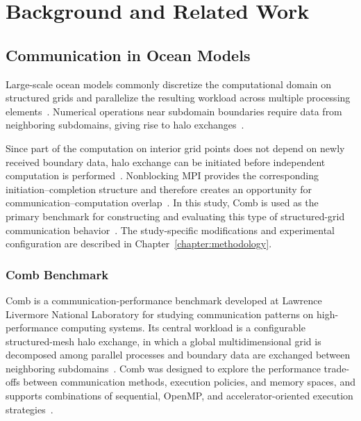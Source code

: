 
\chapter{Background and Related Work}\label{chapter:background}

\section{Communication in Ocean Models}

Large-scale ocean models commonly discretize the computational domain on
structured grids and parallelize the resulting workload across multiple
processing elements~\cite{mittermair2025automatic}.
Numerical operations near subdomain boundaries require data from neighboring
subdomains, giving rise to halo exchanges~\cite{mitgcmCommunication,mittermair2025automatic}.

Since part of the computation on interior grid points does not depend on newly received boundary data, halo exchange can be initiated before independent computation is performed~\cite{mitgcmCommunication,mittermair2025automatic}. Nonblocking MPI provides the corresponding initiation--completion structure and therefore creates an opportunity for communication--computation overlap~\cite[Sec.~4.7]{mpi50}. In this study, Comb is used as the primary benchmark for constructing and evaluating this type of structured-grid communication behavior~\cite{combGithub}. The study-specific modifications and experimental configuration are described in Chapter~\ref{chapter:methodology}.

\subsection{Comb Benchmark}

Comb is a communication-performance benchmark developed at Lawrence
Livermore National Laboratory for studying communication patterns on
high-performance computing systems. Its central workload is a configurable
structured-mesh halo exchange, in which a global multidimensional grid is
decomposed among parallel processes and boundary data are exchanged between
neighboring subdomains~\cite{combGithub}. Comb was designed to explore the
performance trade-offs between communication methods, execution policies,
and memory spaces, and supports combinations of sequential, OpenMP, and
accelerator-oriented execution strategies~\cite{combGithub}.

